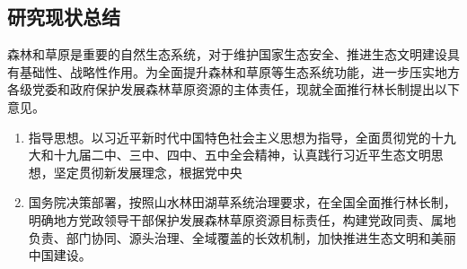 \subsection{研究现状总结}

森林和草原是重要的自然生态系统，对于维护国家生态安全、推进生态文明建设具有基础性、战略性作用。为全面提升森林和草原等生态系统功能，进一步压实地方各级党委和政府保护发展森林草原资源的主体责任，现就全面推行林长制提出以下意见。

\begin{enumerate}
    \item 指导思想。以习近平新时代中国特色社会主义思想为指导，全面贯彻党的十九大和十九届二中、三中、四中、五中全会精神，认真践行习近平生态文明思想，坚定贯彻新发展理念，根据党中央
    \item 国务院决策部署，按照山水林田湖草系统治理要求，在全国全面推行林长制，明确地方党政领导干部保护发展森林草原资源目标责任，构建党政同责、属地负责、部门协同、源头治理、全域覆盖的长效机制，加快推进生态文明和美丽中国建设。
\end{enumerate}
